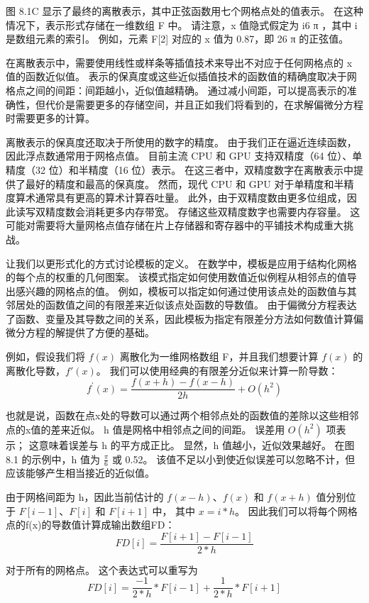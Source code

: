 图 8.1C 显示了最终的离散表示，其中正弦函数用七个网格点处的值表示。 在这种情况下，表示形式存储在一维数组 F 中。
请注意，x 值隐式假定为 i6 π ，其中 i 是数组元素的索引。 例如，元素 F[2] 对应的 x 值为 0.87，即 26 π 的正弦值。

在离散表示中，需要使用线性或样条等插值技术来导出不对应于任何网格点的 x 值的函数近似值。 
表示的保真度或这些近似插值技术的函数值的精确度取决于网格点之间的间距：间距越小，近似值越精确。 
通过减小间距，可以提高表示的准确性，但代价是需要更多的存储空间，并且正如我们将看到的，在求解偏微分方程时需要更多的计算。

离散表示的保真度还取决于所使用的数字的精度。 由于我们正在逼近连续函数，因此浮点数通常用于网格点值。 
目前主流 CPU 和 GPU 支持双精度（64 位）、单精度（32 位）和半精度（16 位）表示。 
在这三者中，双精度数字在离散表示中提供了最好的精度和最高的保真度。 
然而，现代 CPU 和 GPU 对于单精度和半精度算术通常具有更高的算术计算吞吐量。 
此外，由于双精度数由更多位组成，因此读写双精度数会消耗更多内存带宽。 存储这些双精度数字也需要内存容量。 
这可能对需要将大量网格点值存储在片上存储器和寄存器中的平铺技术构成重大挑战。

让我们以更形式化的方式讨论模板的定义。 在数学中，模板是应用于结构化网格的每个点的权重的几何图案。 
该模式指定如何使用数值近似例程从相邻点的值导出感兴趣的网格点的值。 
例如，模板可以指定如何通过使用该点处的函数值与其邻居处的函数值之间的有限差来近似该点处函数的导数值。 
由于偏微分方程表达了函数、变量及其导数之间的关系，因此模板为指定有限差分方法如何数值计算偏微分方程的解提供了方便的基础。

例如，假设我们将 $f(x)$ 离散化为一维网格数组 F，并且我们想要计算 $f(x)$ 的离散化导数，$f'(x)$。 
我们可以使用经典的有限差分近似来计算一阶导数：
$$
f^{\prime}(x)=\frac{f(x+h)-f(x-h)}{2 h}+O\left(h^{2}\right)
$$

也就是说，函数在点x处的导数可以通过两个相邻点处的函数值的差除以这些相邻点的x值的差来近似。 
h 值是网格中相邻点之间的间距。 误差用 $O(h^2)$ 项表示； 这意味着误差与 h 的平方成正比。 
显然，h 值越小，近似效果越好。 在图 8.1 的示例中，h 值为 $\frac{\pi}{6}$ 或 0.52。 
该值不足以小到使近似误差可以忽略不计，但应该能够产生相当接近的近似值。

由于网格间距为 h，因此当前估计的 $f(x - h)$、$f(x)$ 和 $f(x + h)$ 值分别位于 $F[i - 1]$、$F[i]$ 和 $F[i + 1]$ 中，
其中 $x=i*h$。 因此我们可以将每个网格点的f(x)的导数值计算成输出数组FD：
$$
F D[i]=\frac{F[i+1]-F[i-1]}{2 * h}
$$

对于所有的网格点。 这个表达式可以重写为
$$
F D[i]=\frac{-1}{2 * h} * F[i-1]+\frac{1}{2 * h} * F[i+1]
$$

